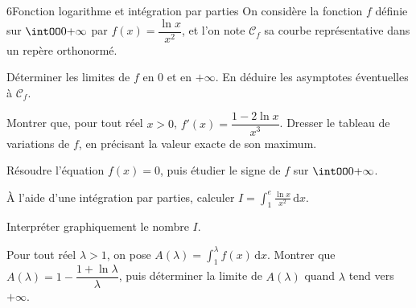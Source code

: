 \begin{exoBac}{6}{Fonction logarithme et intégration par parties}
On considère la fonction $f$ définie sur $\intOO0{+\infty}$ par $f(x)=\dfrac{\ln x}{x^{2}}$, et l'on note $\mathcal{C}_f$ sa courbe
représentative dans un repère orthonormé.
\begin{questions}
  \item Déterminer les limites de $f$ en $0$ et en $+\infty$. En déduire les asymptotes éventuelles à $\mathcal{C}_f$.
  \item Montrer que, pour tout réel $x>0$, $f'(x)=\dfrac{1-2\ln x}{x^{3}}$. Dresser le tableau de variations de $f$, en précisant la
    valeur exacte de son maximum.
  \item Résoudre l'équation $f(x)=0$, puis étudier le signe de $f$ sur $\intOO0{+\infty}$.
\end{questions}
\begin{questions}[resume]
  \item À l'aide d'une intégration par parties, calculer $I=\displaystyle\int_1^{e}\frac{\ln x}{x^{2}}\,\mathrm{d}x$.
  \item Interpréter graphiquement le nombre $I$.
  \item Pour tout réel $\lambda>1$, on pose $A(\lambda)=\displaystyle\int_1^{\lambda}f(x)\,\mathrm{d}x$. Montrer que
    $A(\lambda)=1-\dfrac{1+\ln\lambda}{\lambda}$, puis déterminer la limite de $A(\lambda)$ quand $\lambda$ tend vers $+\infty$.
\end{questions}
\end{exoBac}
